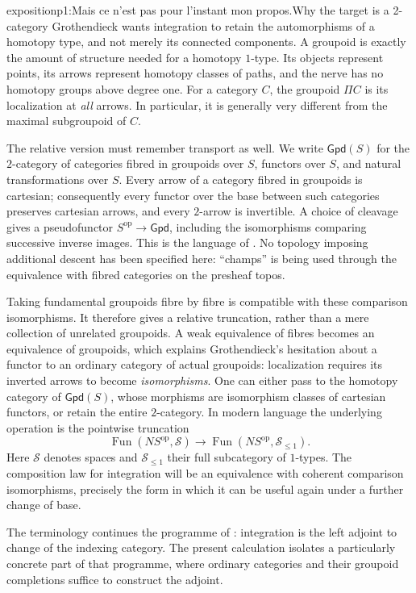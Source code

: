 \begin{dcomment}{exposition}{p1:Mais ce n'est pas pour l'instant mon propos.}{Why the target is a 2-category}
Grothendieck wants integration to retain the automorphisms of a homotopy type, and not merely its connected components. A groupoid is exactly the amount of structure needed for a homotopy $1$-type. Its objects represent points, its arrows represent homotopy classes of paths, and the nerve has no homotopy groups above degree one. For a category $C$, the groupoid $\Pi C$ is its localization at \emph{all} arrows. In particular, it is generally very different from the maximal subgroupoid of $C$.

The relative version must remember transport as well. We write $\mathsf{Gpd}(S)$ for the $2$-category of categories fibred in groupoids over $S$, functors over $S$, and natural transformations over $S$. Every arrow of a category fibred in groupoids is cartesian; consequently every functor over the base between such categories preserves cartesian arrows, and every $2$-arrow is invertible. A choice of cleavage gives a pseudofunctor $S^{\mathrm{op}}\to\mathsf{Gpd}$, including the isomorphisms comparing successive inverse images. This is the language of \citet[Expos\'e VI, \S\S6--8]{SGA1}. No topology imposing additional descent has been specified here: ``champs'' is being used through the equivalence with fibred categories on the presheaf topos.

Taking fundamental groupoids fibre by fibre is compatible with these comparison isomorphisms. It therefore gives a relative truncation, rather than a mere collection of unrelated groupoids. A weak equivalence of fibres becomes an equivalence of groupoids, which explains Grothendieck's hesitation about a functor to an ordinary category of actual groupoids: localization requires its inverted arrows to become \emph{isomorphisms}. One can either pass to the homotopy category of $\mathsf{Gpd}(S)$, whose morphisms are isomorphism classes of cartesian functors, or retain the entire $2$-category. In modern language the underlying operation is the pointwise truncation
\[
 \operatorname{Fun}(NS^{\mathrm{op}},\mathcal S)
 \longrightarrow
 \operatorname{Fun}(NS^{\mathrm{op}},\mathcal S_{\leq1}).
\]
Here $\mathcal S$ denotes spaces and $\mathcal S_{\leq1}$ their full subcategory of $1$-types. The composition law for integration will be an equivalence with coherent comparison isomorphisms, precisely the form in which it can be useful again under a further change of base.

The terminology continues the programme of \citet[\S69, especially printed pp.~3--5]{Grothendieck1983}: integration is the left adjoint to change of the indexing category. The present calculation isolates a particularly concrete part of that programme, where ordinary categories and their groupoid completions suffice to construct the adjoint.
\end{dcomment}

